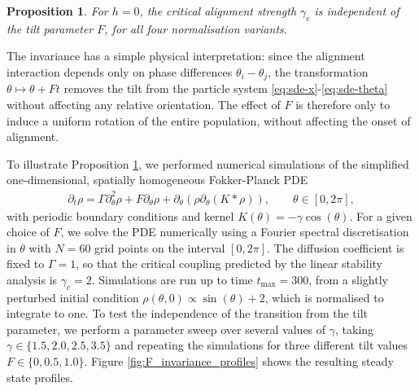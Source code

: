 \documentclass[a4paper,11pt]{article}
\theoremstyle{plain}
\newtheorem{prop}[thm]{Proposition}
\theoremstyle{definition}
\theoremstyle{remark}
\begin{document}
\begin{prop}\label{prop:F-invariance}
    For $h = 0$, the critical alignment strength $\gamma_c$ is independent of the tilt parameter $F$, for all four normalisation variants.
\end{prop}

The invariance has a simple physical interpretation: since the alignment interaction depends only on phase differences $\theta_i - \theta_j$, the transformation $\theta \mapsto \theta + Ft$ removes the tilt from the particle system \eqref{eq:sde-x}-\eqref{eq:sde-theta} without affecting any relative orientation. The effect of $F$ is therefore only to induce a uniform rotation of the entire population, without affecting the onset of alignment.

To illustrate Proposition \ref{prop:F-invariance}, we performed numerical simulations of the simplified one-dimensional, spatially homogeneous Fokker-Planck PDE
\begin{align*}
    \partial_t \rho = \Gamma \partial_{\theta}^2 \rho + F \partial_{\theta} \rho + \partial_{\theta}(\rho \partial_{\theta}(K * \rho)), \qquad \theta \in [0,2\pi],
\end{align*}
with periodic boundary conditions and kernel $K(\theta) = -\gamma \cos(\theta)$. For a given choice of $F$, we solve the PDE numerically using a Fourier spectral discretisation in $\theta$ with $N=60$ grid points on the interval $[0,2\pi]$. The diffusion coefficient is fixed to $\Gamma = 1$, so that the critical coupling predicted by the linear stability analysis is $\gamma_c = 2$. Simulations are run up to time $t_{\text{max}} = 300$, from a slightly perturbed initial condition $\rho(\theta,0) \propto \sin(\theta) + 2$, which is normalised to integrate to one. To test the independence of the transition from the tilt parameter, we perform a parameter sweep over several values of $\gamma$, taking $\gamma \in \{ 1.5, 2.0, 2.5, 3.5\}$ and repeating the simulations for three different tilt values $F \in \{0, 0.5, 1.0 \}$. Figure \ref{fig:F_invariance_profiles} shows the resulting steady state profiles.
\end{document}
